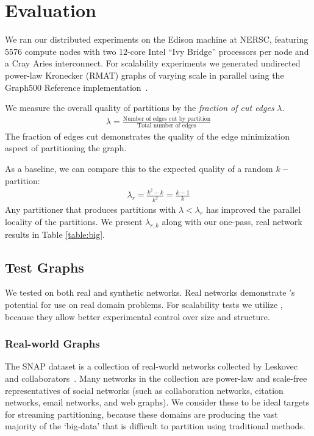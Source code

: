 \section{Evaluation}
We ran our distributed experiments on the Edison machine at NERSC, featuring 5576 compute nodes with two 12-core Intel ``Ivy Bridge'' processors per node and a Cray Aries interconnect. For scalability experiments we generated undirected power-law Kronecker (RMAT) graphs of varying scale in parallel using the Graph500 Reference implementation~\cite{graph500}. 

We measure the overall quality of partitions by the \textit{fraction of cut edges} $\lambda$.
\begin{align}\lambda = \frac{\text{Number of edges cut by partition}}{\text{Total number of edges}}\end{align}
The fraction of edges cut demonstrates the quality of the edge minimization aspect of partitioning the graph.

As a baseline, we can compare this to the expected quality of a random $k-$partition:
\begin{align}\lambda_r = \frac{k^2 - k}{k^2} = \frac{k-1}{k} \end{align}
Any partitioner that produces partitions with $\lambda < \lambda_r$ has improved the parallel locality of the partitions. 
We present $\lambda_{r,k}$ along with our one-pass, real network results in Table \ref{table:big}.


\subsection{Test Graphs}
We tested \ourmethod on both real and synthetic networks.
Real networks demonstrate \ourmethod's potential for use on real domain problems.
For scalability tests we utilize , because they allow better experimental control over size and structure.
\subsubsection{Real-world Graphs}
The SNAP dataset is a collection of real-world networks collected by Leskovec and collaborators~\cite{Leskovec-data, snapnets}. 
Many networks in the collection are power-law and scale-free representatives of social networks (such as collaboration networks, citation networks, email networks, and web graphs). We consider these to be ideal targets for streaming partitioning, because these domains are producing the vast majority of the `big-data' that is difficult to partition using traditional methods.

